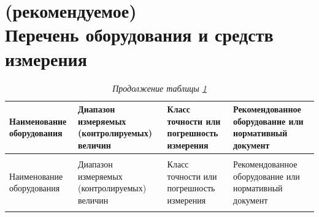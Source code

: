 {\color{unimain}\section[(рекомендуемое) Перечень оборудования и средств измерения]{(рекомендуемое)\\Перечень оборудования и средств измерения}\label{app:unit}}
\color{black}

\begingroup
\small
\setlength{\extrarowheight}{0.1cm}
\setlength{\LTpre}{0pt}
\setlength{\LTpost}{0pt}

\begin{longtable}{
  |>{\raggedright\arraybackslash}p{6.5cm}
  |>{\centering\arraybackslash}p{3cm}
  |>{\centering\arraybackslash}p{3cm}
  |>{\centering\arraybackslash}p{3.5cm}|
}
\caption{Перечень оборудования и средств измерения\hfill\vspace{-0.5\baselineskip}}\label{appunit:tbl1}\\
\hline
\rowcolor{gray!30}
Наименование оборудования & 
Диапазон измеряемых (контролируемых) величин & 
Класс точности или погрешность измерения & 
Рекомендованное оборудование или нормативный документ \\
\hline
\endfirsthead

\caption*{\hspace{3pt}\emph{Продолжение таблицы \ref{appunit:tbl1}\hfill\vspace{-0.5\baselineskip}}} \\
\hline
\rowcolor{gray!30}
Наименование оборудования & 
Диапазон измеряемых (контролируемых) величин & 
Класс точности или погрешность измерения & 
Рекомендованное оборудование или нормативный документ \\
\hline
\endhead
\hline
\endfoot
\endlastfoot


\end{longtable}
